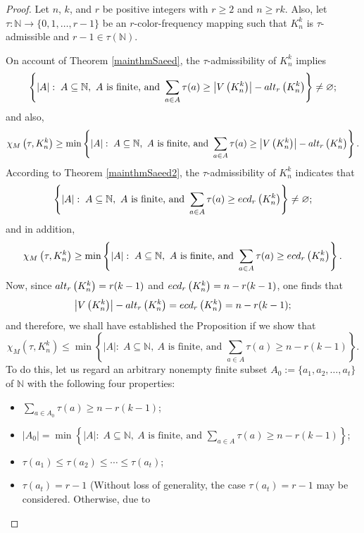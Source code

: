 \documentclass[10pt,a4paper]{amsart}
\begin{document}
\begin{proof}
	Let $n$, $k$, and $r$ be positive integers with $r\geq 2$ and
	$n\geq rk$. Also, let $\tau:\mathbb{N}\longrightarrow \{0,1,\ldots,r-1\}$
	be an $r$-color-frequency mapping such that $K_n^k$ is $\tau$-admissible and $r-1\in\tau(\mathbb{N})$.
	
	On account of Theorem \ref{mainthmSaeed}, the $\tau$-admissibility of $K_n^k$ implies
	$$\left\{|A|:\; A\subseteq \mathbb{N},\ A \mbox{ is finite, and } \sum_{a\in A}\tau(a) \geq  \left|V\left(K_n^k\right)\right|-{\rm alt}_r\left(K_n^k\right)\right\} \neq \varnothing ;$$
	and also,
	$$\chi_M\left(\tau,K_n^k\right) \geq \min \left\{|A|:\; A\subseteq \mathbb{N},\ A \mbox{ is finite, and } \sum_{a\in A}\tau(a) \geq  \left|V\left(K_n^k\right)\right|-{\rm alt}_r\left(K_n^k\right)\right\} .$$
	According to Theorem \ref{mainthmSaeed2}, the $\tau$-admissibility of $K_n^k$ indicates that
	$$\left\{|A|:\; A\subseteq \mathbb{N},\ A \mbox{ is finite, and } \sum_{a\in A}\tau(a) \geq  {\rm ecd}_r\left(K_n^k\right)\right\} \neq \varnothing ;$$
	and in addition,
	$$\chi_M\left(\tau,K_n^k\right) \geq \min \left\{|A|:\; A\subseteq \mathbb{N},\ A \mbox{ is finite, and } \sum_{a\in A}\tau(a) \geq  {\rm ecd}_r\left(K_n^k\right)\right\} .$$
	Now, since ${\rm alt}_r\left(K_n^k\right)= r(k-1)$ and ${\rm ecd}_r\left(K_n^k\right)= n - r(k-1)$,
	one finds that
	$$\left|V\left(K_n^k\right)\right|-{\rm alt}_r\left(K_n^k\right) = {\rm ecd}_r\left(K_n^k\right)= n - r(k-1) ;$$
	and therefore, we shall have established the Proposition if we show that
	$$\chi_M\left(\tau,K_n^k\right)\leq \min \left\{|A|:\; A\subseteq \mathbb{N},\ A \mbox{ is finite, and } \sum_{a\in A}\tau(a) \geq  n-r(k-1)\right\} .$$
	To do this, let us regard an arbitrary nonempty finite subset $A_0:=\{a_1,a_2,\ldots,a_t\}$ of $\mathbb{N}$ with the following four properties:
	\begin{itemize}
		\item $\displaystyle\sum_{a\in A_0}\tau(a) \geq  n-r(k-1) $; \\
		\item $\left| A_0 \right| = \min \left\{|A|:\; A\subseteq \mathbb{N},\ A \mbox{ is finite, and } \displaystyle\sum_{a\in A}\tau(a) \geq  n-r(k-1)\right\} $; \\
		\item $\tau(a_{1})\leq\tau(a_{2})\leq\cdots\leq\tau(a_{t})$; \\
		\item $\tau(a_{t})=r-1$ (Without loss of generality, the case 
		$\tau(a_{t})=r-1$
		may be considered. Otherwise, due to

\end{itemize}
\end{proof}
\end{document}
